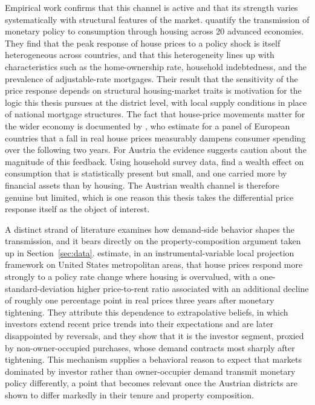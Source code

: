 \documentclass[a4paper,12pt, headsepline]{scrartcl}
\numberwithin{equation}{section}
\begin{document}
Empirical work confirms that this channel is active and that its strength varies systematically with structural features of the market. \citet{dicasola2026} quantify the transmission of monetary policy to consumption through housing across 20 advanced economies. They find that the peak response of house prices to a policy shock is itself heterogeneous across countries, and that this heterogeneity lines up with characteristics such as the home-ownership rate, household indebtedness, and the prevalence of adjustable-rate mortgages. Their result that the sensitivity of the price response depends on structural housing-market traits is motivation for the logic this thesis pursues at the district level, with local supply conditions in place of national mortgage structures. The fact that house-price movements matter for the wider economy is documented by \citet{cevik2023}, who estimate for a panel of European countries that a fall in real house prices measurably dampens consumer spending over the following two years. For Austria the evidence suggests caution about the magnitude of this feedback. Using household survey data, \citet{albacete2017} find a wealth effect on consumption that is statistically present but small, and one carried more by financial assets than by housing. The Austrian wealth channel is therefore genuine but limited, which is one reason this thesis takes the differential price response itself as the object of interest.

A distinct strand of literature examines how demand-side behavior shapes the transmission, and it bears directly on the property-composition argument taken up in Section~\ref{sec:data}. \citet{biljanovska2025} estimate, in an instrumental-variable local projection framework on United States metropolitan areas, that house prices respond more strongly to a policy rate change where housing is overvalued, with a one-standard-deviation higher price-to-rent ratio associated with an additional decline of roughly one percentage point in real prices three years after monetary tightening. They attribute this dependence to extrapolative beliefs, in which investors extend recent price trends into their expectations and are later disappointed by reversals, and they show that it is the investor segment, proxied by non-owner-occupied purchases, whose demand contracts most sharply after tightening. This mechanism supplies a behavioral reason to expect that markets dominated by investor rather than owner-occupier demand transmit monetary policy differently, a point that becomes relevant once the Austrian districts are shown to differ markedly in their tenure and property composition.
\end{document}
